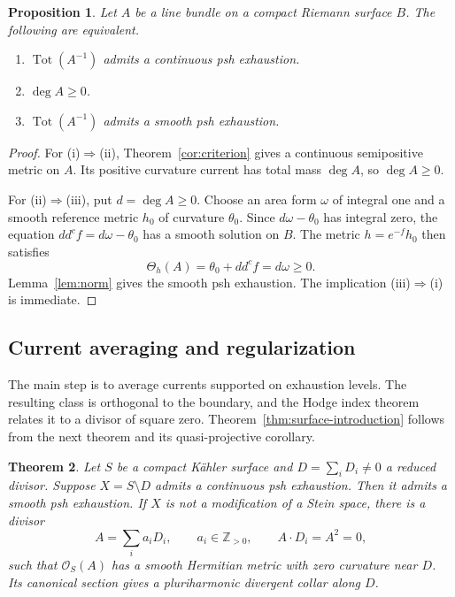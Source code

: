 \documentclass[11pt]{amsart}
\newtheorem{theorem}{Theorem}[section]
\newtheorem{proposition}[theorem]{Proposition}
\theoremstyle{definition}
\theoremstyle{remark}
\numberwithin{equation}{section}
\newcommand{\OO}{\mathcal O}
\newcommand{\Tot}{\operatorname{Tot}}
\newcommand{\ddc}{dd^c}
\begin{document}
\begin{proposition}\label{cor:curve-total-space}
Let $A$ be a line bundle on a compact Riemann surface $B$.
The following are equivalent.
\begin{enumerate}[label=\textup{(\roman*)},leftmargin=2.5em]
\item $\Tot(A^{-1})$ admits a continuous psh exhaustion.
\item $\deg A\ge0$.
\item $\Tot(A^{-1})$ admits a smooth psh exhaustion.
\end{enumerate}
\end{proposition}
\begin{proof}
For \textup{(i)}$\Rightarrow$\textup{(ii)},
Theorem~\ref{cor:criterion} gives a continuous semipositive metric on $A$.
Its positive curvature current has total mass $\deg A$, so $\deg A\ge0$.

For \textup{(ii)}$\Rightarrow$\textup{(iii)}, put $d=\deg A\ge0$.
Choose an area form $\omega$ of integral one and a smooth reference
metric $h_0$ of curvature $\theta_0$. Since $d\omega-\theta_0$ has
integral zero, the equation $\ddc f=d\omega-\theta_0$ has a smooth
solution on $B$. The metric $h=e^{-f}h_0$ then satisfies
\[
 \Theta_h(A)=\theta_0+\ddc f=d\omega\ge0.
\]
Lemma~\ref{lem:norm} gives the smooth psh exhaustion.
The implication \textup{(iii)}$\Rightarrow$\textup{(i)} is immediate.
\end{proof}

\subsection{Current averaging and regularization}
\label{subsec:divisor-regularization}

The main step is to average currents supported on exhaustion levels.
The resulting class is orthogonal to the boundary, and the Hodge index
theorem relates it to a divisor of square zero.
Theorem~\ref{thm:surface-introduction} follows from the next theorem
and its quasi-projective corollary.

\begin{theorem}\label{thm:divisor-regularization}
Let $S$ be a compact K\"ahler surface and $D=\sum_iD_i\ne0$ a reduced
divisor. Suppose $X=S\setminus D$ admits a continuous psh exhaustion.
Then it admits a smooth psh exhaustion. If $X$ is not a modification
of a Stein space, there is a divisor
\[
 A=\sum_i a_iD_i,\qquad a_i\in\mathbb Z_{>0},\qquad
 A\cdot D_i=A^2=0,
\]
such that $\OO_S(A)$ has a smooth Hermitian metric with zero
curvature near $D$. Its canonical section gives a pluriharmonic
divergent collar along $D$.
\end{theorem}
\end{document}
